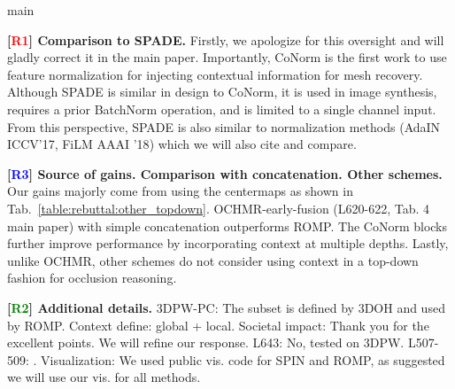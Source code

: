 main\documentclass[10pt,twocolumn,letterpaper]{article}
\newcommand{\Rone}{\textcolor{Red}{R1}}
\newcommand{\Rtwo}{\textcolor{Green}{R2}}
\newcommand{\Rthree}{\textcolor{Blue}{R3}}
\begin{document}
\vspace{1.0mm}\noindent
\textbf{[\Rone] Comparison to SPADE.} Firstly, we apologize for this oversight and will gladly correct it in the main paper. Importantly, CoNorm is the first work to use feature normalization for injecting contextual information for mesh recovery. Although SPADE is similar in design to CoNorm, it is used in image synthesis, requires a prior BatchNorm operation, and is limited to a single channel input. From this perspective, SPADE is also similar to normalization methods (\eg AdaIN {\scriptsize ICCV'17}, FiLM {\scriptsize AAAI '18}) which we will also cite and compare.

\vspace{1.0mm}\noindent
\textbf{[\Rthree] Source of gains. Comparison with concatenation. Other schemes.} Our gains majorly come from using the centermaps as shown in Tab.~\ref{table:rebuttal:other_topdown}. OCHMR-early-fusion (L620-622, Tab. 4 main paper) with simple concatenation outperforms ROMP. The CoNorm blocks further improve performance by incorporating context at multiple depths. Lastly, unlike OCHMR, other schemes do not consider using context in a top-down fashion for occlusion reasoning.


\vspace{1.0mm}\noindent
\textbf{[\Rtwo] Additional details.} 3DPW-PC: The subset is defined by 3DOH and used by ROMP. Context define: global + local. Societal impact: Thank you for the excellent points. We will refine our response. L643: No, tested on 3DPW. L507-509: . Visualization: We used public vis. code for SPIN and ROMP, as suggested we will use our vis. for all methods. 
\end{document}
